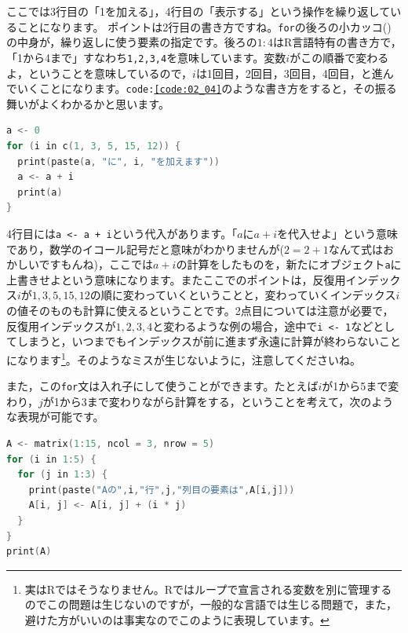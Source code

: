 \documentclass{ltjsbook}
\begin{document}
ここでは3行目の「1を加える」，4行目の「表示する」という操作を繰り返していることになります。
ポイントは2行目の書き方ですね。\texttt{for}の後ろの小カッコ()の中身が，繰り返しに使う要素の指定です。後ろの$1:4$はR言語特有の書き方で，「1から4まで」すなわち\verb|1,2,3,4|を意味しています。変数$i$がこの順番で変わるよ，ということを意味しているので，$i$は1回目，2回目，3回目，4回目，と進んでいくことになります。\texttt{code:\ref{code:02_04}}のような書き方をすると，その振る舞いがよくわかるかと思います。

\begin{lstlisting}[language=c++,label={code:02_04},caption={反復操作2}]
a <- 0
for (i in c(1, 3, 5, 15, 12)) {
  print(paste(a, "に", i, "を加えます"))
  a <- a + i
  print(a)
}
\end{lstlisting}

4行目には\verb|a <- a + i|という代入があります。「$a$に$a+i$を代入せよ」という意味であり，数学のイコール記号だと意味がわかりませんが($2 = 2 + 1$なんて式はおかしいですもんね)，ここでは$a+i$の計算をしたものを，新たにオブジェクト\verb|a|に上書きせよという意味になります。またここでのポイントは，反復用インデックス$i$が$1,3,5,15,12$の順に変わっていくということと，変わっていくインデックス$i$の値そのものも計算に使えるということです。2点目については注意が必要で，反復用インデックスが$1,2,3,4$と変わるような例の場合，途中で\verb|i <- 1|などとしてしまうと，いつまでもインデックスが前に進まず永遠に計算が終わらないことになります\footnote{実はRではそうなりません。Rではループで宣言される変数を別に管理するのでこの問題は生じないのですが，一般的な言語では生じる問題で，また，避けた方がいいのは事実なのでこのように表現しています。}。そのようなミスが生じないように，注意してくださいね。

また，この\verb|for|文は入れ子にして使うことができます。たとえば$i$が1から5まで変わり，$j$が1から3まで変わりながら計算をする，ということを考えて，次のような表現が可能です。
\begin{lstlisting}[language=c++,label={code:02_05},caption={反復操作3}]
A <- matrix(1:15, ncol = 3, nrow = 5)
for (i in 1:5) {
  for (j in 1:3) {
    print(paste("Aの",i,"行",j,"列目の要素は",A[i,j]))
    A[i, j] <- A[i, j] + (i * j)
  }
}
print(A)
\end{lstlisting}
\end{document}
